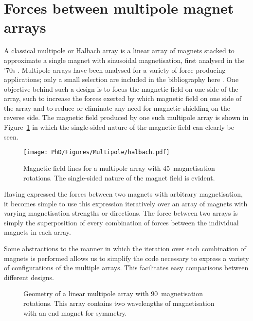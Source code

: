 \section{Forces between multipole magnet arrays}

A classical multipole or Halbach array is a linear array of magnets stacked to approximate a single magnet with sinusoidal magnetisation, first analysed in the '70s \parencite{halbach1981,shute2000}. Multipole arrays have been analysed for a variety of force-producing applications; only a small selection are included in the bibliography here \parencite{lee2004-mx,robertson2005,rovers2009-ietm}. One objective behind such a design is to focus the magnetic field on one side of the array, such to increase the forces exerted by which magnetic field on one side of the array and to reduce or eliminate any need for magnetic shielding on the reverse side. The magnetic field produced by one such multipole array is shown in Figure~\ref{halbach} in which the single-sided nature of the magnetic field can clearly be seen.

\begin{figure}
\centering
\texttt{[image: PhD/Figures/Multipole/halbach.pdf]}
\caption{Magnetic field lines for a multipole array with 45\textdegree\ magnetisation rotations. The single-sided nature of the magnet field is evident.}
\label{halbach}
\end{figure}

Having expressed the forces between two magnets with arbitrary magnetisation, it becomes simple to use this expression iteratively over an array of magnets with varying magnetisation strengths or directions. The force between two arrays is simply the superposition of every combination of forces between the individual magnets in each array.

Some abstractions to the manner in which the iteration over each combination of magnets is performed allows us to simplify the code necessary to express a variety of configurations of the multiple arrays. This facilitates easy comparisons between different designs.

\begin{figure}
\centering
{}
\caption{Geometry of a linear multipole array with 90\textdegree\ magnetisation rotations. This array contains two wavelengths of magnetisation with an end magnet for symmetry.}
\label{multipole-variables}
\end{figure}

